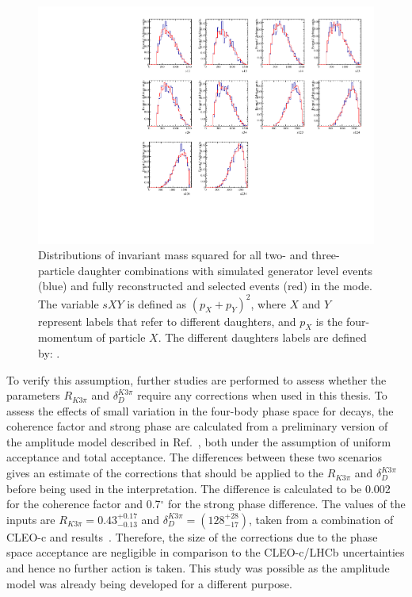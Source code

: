 \begin{figure}[h]
\centering
\includegraphics[width=0.9\linewidth]{figures/results/dalitzDist_PiPiPiPi.pdf}
\caption{Distributions of invariant mass squared for all two- and three-particle \Dz daughter combinations with simulated generator level events (blue) and fully reconstructed and selected events (red) in the \pipipipi mode. The variable $sXY$ is defined as $(p_X + p_Y)^2$, where $X$ and $Y$ represent labels that refer to different \Dz daughters, and $p_X$ is the four-momentum of particle $X$. The different \Dz daughters labels are defined by: .}
\label{dalitz4pi}
\end{figure}

To verify this assumption, further studies are performed to assess whether the parameters $R_{K3\pi}$ and $\delta_D^{K3\pi}$ require any corrections when used in this thesis. To assess the effects of small variation in the four-body phase space for \kpipipi decays, the coherence factor and strong phase are calculated from a preliminary version of the \decay{\Dz}{\Km\pip\pim\pip} amplitude model described in Ref.~\cite{LHCb-PAPER-2017-040}, both under the assumption of uniform acceptance and total \lhcb acceptance. The differences between these two scenarios gives an estimate of the corrections that should be applied to the $R_{K3\pi}$ and $\delta_D^{K3\pi}$ before being used in the \lhcb interpretation. The difference is calculated to be 0.002 for the coherence factor and 0.7$^{\circ}$ for the strong phase difference. The values of the inputs are $R_{K3\pi} = 0.43^{+0.17}_{-0.13}$ and $\delta_D^{K3\pi} = \left(128^{+28}_{-17}\right)$, taken from a combination of CLEO-c and \lhcb results~\cite{charmk3pi,charmk3pi_errata,LHCb-PAPER-2015-057}. Therefore, the size of the corrections due to the \lhcb phase space acceptance are negligible in comparison to the CLEO-c/LHCb uncertainties and hence no further action is taken. This study was possible as the \decay{\Dz}{\Km\pip\pim\pip} amplitude model was already being developed for a different purpose.

